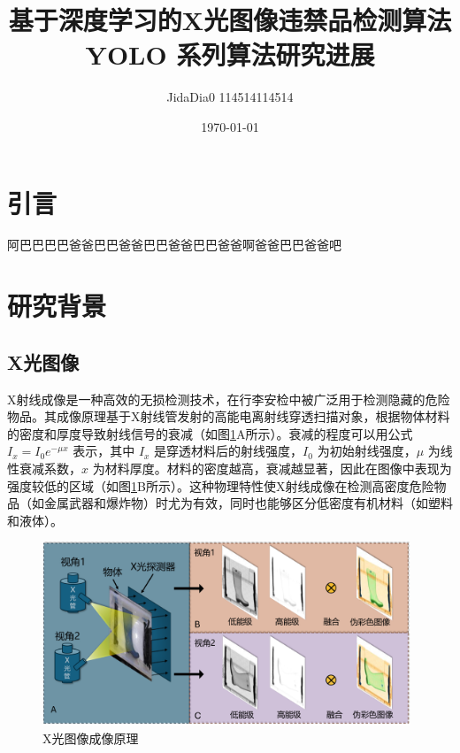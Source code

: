 \documentclass[11pt,twocolumn]{ctexart}
\begin{document}
\title{\textbf{基于深度学习的X光图像违禁品检测算法}\\[1ex]YOLO 系列算法研究进展}
\author{JidaDia0 114514114514}
\date{\today}
\section{引言}
阿巴巴巴巴爸爸巴巴爸爸巴巴爸爸巴巴爸爸啊爸爸巴巴爸爸吧

\section{研究背景}


\subsection{X光图像}
X射线成像是一种高效的无损检测技术，在行李安检中被广泛用于检测隐藏的危险物品。其成像原理基于X射线管发射的高能电离射线穿透扫描对象，根据物体材料的密度和厚度导致射线信号的衰减（如图\ref{X光图像原理}A所示）。衰减的程度可以用公式 $I_x = I_0 e^{-\mu x}$ 表示，其中 $I_x$ 是穿透材料后的射线强度，$I_0$ 为初始射线强度，$\mu$ 为线性衰减系数，$x$ 为材料厚度\cite{mery2020computer}。材料的密度越高，衰减越显著，因此在图像中表现为强度较低的区域（如图\ref{X光图像原理}B所示）。这种物理特性使X射线成像在检测高密度危险物品（如金属武器和爆炸物）时尤为有效，同时也能够区分低密度有机材料（如塑料和液体）。
\begin{figure}[!hbtp]
  \begin{center}
  \includegraphics[width=0.98\textwidth]{figure/X光示意图}
  \end{center}
  \caption{X光图像成像原理}
  \label{X光图像原理}
\end{figure}
\end{document}
